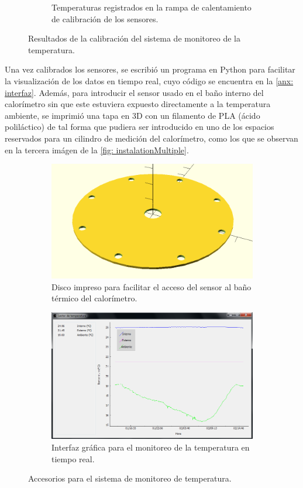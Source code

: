 \begin{figure}[h]
\begin{subfigure}{0.45\linewidth}
			\caption{Temperaturas registrados en la rampa de calentamiento de calibración de los sensores.}
			\label{fig: timeTemperature}
		\end{subfigure}
		\caption{Resultados de la calibración del sistema de monitoreo de la temperatura.}
		\label{fig: voltageTemperature}
	\end{figure}
	\pagebreak

	Una vez calibrados los sensores, se escribió un programa en Python para facilitar la visualización de los datos en tiempo real, cuyo código se encuentra en la \autoref{anx: interfaz}. Además, para introducir el sensor usado en el baño interno del calorímetro sin que este estuviera expuesto directamente a la temperatura ambiente, se imprimió una tapa en 3D con un filamento de PLA (ácido poliláctico) de tal forma que pudiera ser introducido en uno de los espacios reservados para un cilindro de medición del calorímetro, como los que se observan en la tercera im\'agen de la \autoref{fig: instalationMultiple}.
	\begin{figure}[h]
		\centering
		\begin{subfigure}{0.45\linewidth}
			\includegraphics[width=\linewidth]{Figures/PLAdisk}
			\caption{Disco impreso para facilitar el acceso del sensor al baño térmico del calorímetro.}
		\end{subfigure}
		\begin{subfigure}{0.45\linewidth}
			\includegraphics[width=\linewidth]{Figures/temperatureReader}
			\caption{Interfaz gráfica para el monitoreo de la temperatura en tiempo real.}
		\end{subfigure}
		\caption{Accesorios para el sistema de monitoreo de temperatura.}
	\end{figure}
